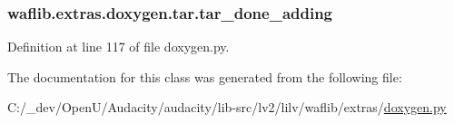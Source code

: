\subsubsection[{\texorpdfstring{tar\+\_\+done\+\_\+adding}{tar_done_adding}}]{\setlength{\rightskip}{0pt plus 5cm}waflib.\+extras.\+doxygen.\+tar.\+tar\+\_\+done\+\_\+adding}\hypertarget{classwaflib_1_1extras_1_1doxygen_1_1tar_a9697fe6cf03d445d0d9c5df25b8f90b1}{}\label{classwaflib_1_1extras_1_1doxygen_1_1tar_a9697fe6cf03d445d0d9c5df25b8f90b1}


Definition at line 117 of file doxygen.\+py.



The documentation for this class was generated from the following file\+:\begin{DoxyCompactItemize}
\item 
C\+:/\+\_\+dev/\+Open\+U/\+Audacity/audacity/lib-\/src/lv2/lilv/waflib/extras/\hyperlink{lilv_2waflib_2extras_2doxygen_8py}{doxygen.\+py}\end{DoxyCompactItemize}

